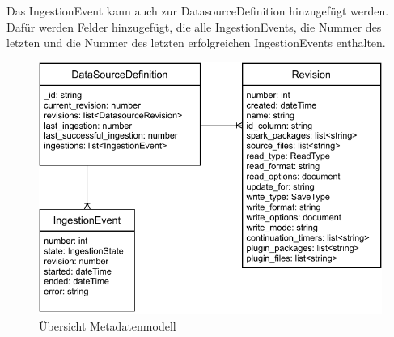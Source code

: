 Das IngestionEvent kann auch zur DatasourceDefinition hinzugefügt werden.
Dafür werden Felder hinzugefügt, die alle IngestionEvents, die Nummer des letzten und die Nummer des letzten erfolgreichen IngestionEvents enthalten.

\begin{figure}
    \centering
    \includegraphics{Grafiken/Entwicklung-Datenmodell.pdf}
    \caption{Übersicht Metadatenmodell}
    \label{fig:datenmodell}
\end{figure}